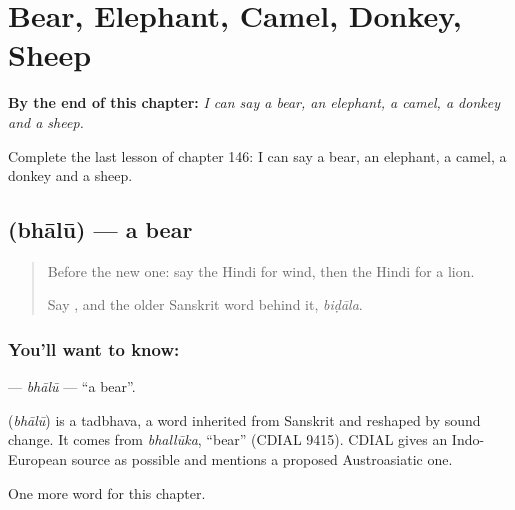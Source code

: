 
\chapter{Bear, Elephant, Camel, Donkey, Sheep}
\label{ch:hi-bear-elephant-camel-donkey-sheep}

\begin{chapteropening}
\textbf{By the end of this chapter:} \emph{I can say a bear, an elephant, a camel, a donkey and a sheep.}

Complete the last lesson of chapter 146: I can say a bear, an elephant, a camel, a donkey and a sheep.
\end{chapteropening}

\section[\texorpdfstring{\hi{भालू} (bhālū)}{भालू (bhālū)}]{ (bhālū) — a bear}

\label{lesson:HI-C146-bhalu}



\begin{quote}
Before the new one: say the Hindi for wind, then the Hindi for a lion.

Say \textbf{}, and the older Sanskrit word behind it, \emph{biḍāla}.
\end{quote}

\subsection*{You'll want to know: }
\textbf{} — \emph{bhālū} — \textquotedblleft{}a bear\textquotedblright{}.

\begin{cousinweb}
\textbf{} (\emph{bhālū}) is a tadbhava, a word inherited from Sanskrit and reshaped by sound change. It comes from \emph{bhallūka}, \textquotedblleft{}bear\textquotedblright{} (CDIAL 9415). CDIAL gives an Indo-European source as possible and mentions a proposed Austroasiatic one.
\end{cousinweb}

\begin{grammarlens}[title={What you've built}]
One more word for this chapter.
\end{grammarlens}

